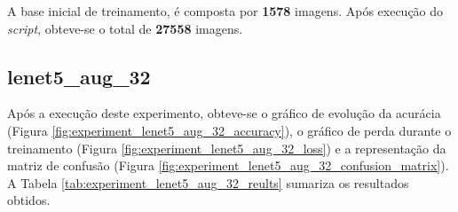 \documentclass[12pt]{article}
\begin{document}
A base inicial de treinamento, é composta por \textbf{1578} imagens. Após execução do \textit{script}, obteve-se o total de \textbf{27558} imagens.

\newpage

\subsection{lenet5\_aug\_32}

Após a execução deste experimento, obteve-se o gráfico de evolução da acurácia (Figura \ref{fig:experiment_lenet5_aug_32_accuracy}), o gráfico de perda durante o treinamento (Figura \ref{fig:experiment_lenet5_aug_32_loss}) e a representação da matriz de confusão (Figura \ref{fig:experiment_lenet5_aug_32_confusion_matrix}). A Tabela \ref{tab:experiment_lenet5_aug_32_reults} sumariza os resultados obtidos.
\end{document}
